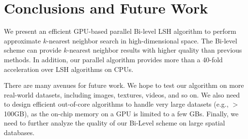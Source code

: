 



\section{Conclusions and Future Work}
We present an efficient GPU-based parallel Bi-level LSH algorithm to perform approximate $k$-nearest neighbor search in high-dimensional space. The Bi-level scheme can provide $k$-nearest neighbor results with higher quality than previous methods. In addition, our parallel algorithm
provides more than a 40-fold acceleration over LSH algorithms on CPUs.

There are many avenues for future work.  We hope to test our algorithm on more real-world datasets, including images, textures, videos, and so on. We also need to design efficient out-of-core algorithms to handle very large datasets (e.g., $>$ 100GB), as the on-chip memory on a GPU is limited to a few GBs. Finally, we need to further analyze the quality of our Bi-Level scheme on large spatial databases.








